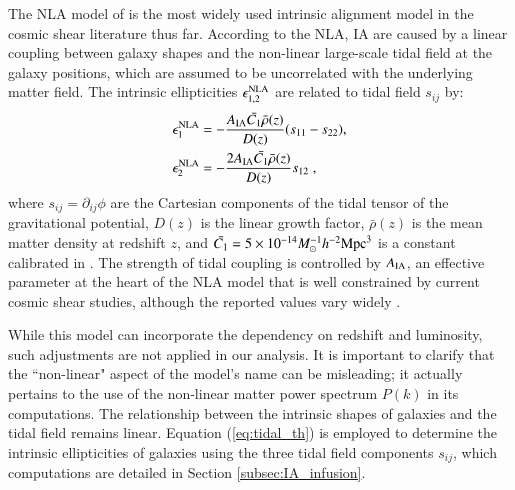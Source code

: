 The NLA model of \citet{NLA} is the most widely used intrinsic alignment model in the cosmic shear literature thus far.
According to the NLA, IA are caused by a linear coupling between galaxy shapes and the non-linear large-scale tidal field at the galaxy positions, which are assumed to be uncorrelated with the underlying matter field.
The intrinsic ellipticities $\epsilon_{1,2}^{\rm NLA}$ are related to tidal field $s_{ij}$ by:
\begin{equation}
\begin{split}
\epsilon_1^{\rm NLA} &= - \frac{A_{\rm IA}\bar{C_1}\bar{\rho}(z)}{D(z)} (s_{11} - s_{22}) , \\    \epsilon_2^{\rm NLA} &= - \frac{2 A_{\rm IA}\bar{C_1}\bar{\rho}(z)}{D(z)} s_{12}\;,
\label{eq:tidal_th}
\end{split}
\end{equation}
where $s_{ij} = \partial_{ij}\phi$ are the Cartesian components of the tidal tensor of the gravitational potential,  $D(z)$ is the linear growth factor, $\bar{\rho}(z)$ is the mean matter density at redshift $z$, and $\bar{C_1}=5\times 10^{-14} M_{\odot}^{-1} h^{-2} {\rm Mpc}^3$ is a constant calibrated in \citet{Brown2002}. 
The strength of tidal coupling is controlled by $A_{\rm IA}$, an effective parameter at the heart of the NLA model that is well constrained by current cosmic shear studies, although the reported values vary widely \citep{KiDS1000_Asgari, DESY3_Amon}.

While this model can incorporate the dependency  on redshift and luminosity, such adjustments are not applied in our analysis.
It is important to clarify that the ``non-linear" aspect of the model's name can be misleading; it actually pertains to the use of the non-linear matter power spectrum $P(k)$ in its computations. 
The relationship between the intrinsic shapes of galaxies and the tidal field remains linear.
Equation (\ref{eq:tidal_th}) is employed to determine the intrinsic ellipticities of galaxies using the three tidal field components $s_{ij}$, which computations are detailed in Section \ref{subsec:IA_infusion}.

